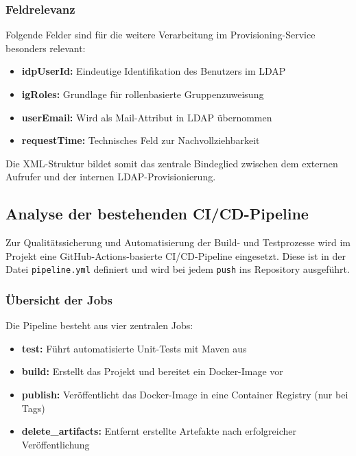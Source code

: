 \subsubsection*{Feldrelevanz}

Folgende Felder sind für die weitere Verarbeitung im Provisioning-Service besonders relevant:

\begin{itemize}
  \item \textbf{idpUserId:} Eindeutige Identifikation des Benutzers im LDAP
  \item \textbf{igRoles:} Grundlage für rollenbasierte Gruppenzuweisung
  \item \textbf{userEmail:} Wird als Mail-Attribut in LDAP übernommen
  \item \textbf{requestTime:} Technisches Feld zur Nachvollziehbarkeit
\end{itemize}

Die XML-Struktur bildet somit das zentrale Bindeglied zwischen dem externen Aufrufer und der internen LDAP-Provisionierung.

\subsection{Analyse der bestehenden CI/CD-Pipeline}

Zur Qualitätssicherung und Automatisierung der Build- und Testprozesse wird im Projekt eine GitHub-Actions-basierte CI/CD-Pipeline eingesetzt. Diese ist in der Datei \texttt{pipeline.yml} definiert und wird bei jedem \texttt{push} ins Repository ausgeführt.

\subsubsection*{Übersicht der Jobs}

Die Pipeline besteht aus vier zentralen Jobs:

\begin{itemize}
  \item \textbf{test:} Führt automatisierte Unit-Tests mit Maven aus
  \item \textbf{build:} Erstellt das Projekt und bereitet ein Docker-Image vor
  \item \textbf{publish:} Veröffentlicht das Docker-Image in eine Container Registry (nur bei Tags)
  \item \textbf{delete\_artifacts:} Entfernt erstellte Artefakte nach erfolgreicher Veröffentlichung
\end{itemize}


